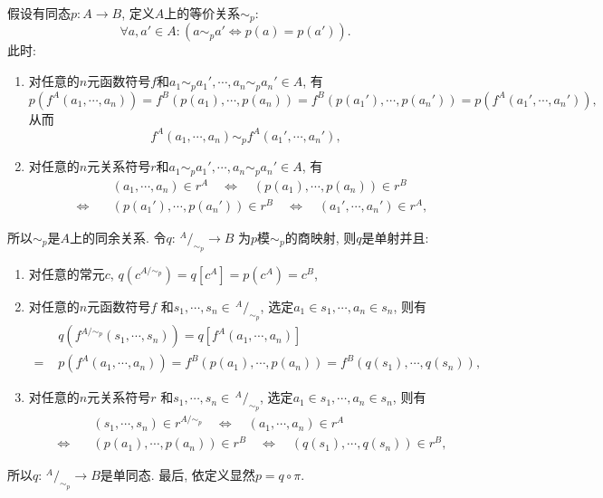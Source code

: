 假设有同态$p:A\to B$, 定义$A$上的等价关系$\sim_p$:
\[
    \forall a,a'\in A:(a\sim_p a'\iff p(a)=p(a')).
\]
此时:
\begin{enumerate}
    \item 对任意的$n$元函数符号$f$和$a_1\sim_p a_1',\cdots,a_n\sim_p a_n'\in A$, 有
    \[
        p(f^A(a_1,\cdots,a_n))=f^B(p(a_1),\cdots,p(a_n))
        =f^B(p(a_1'),\cdots,p(a_n'))=p(f^A(a_1',\cdots,a_n')),
    \]
    从而
    \[
        f^A(a_1,\cdots,a_n)\sim_p f^A(a_1',\cdots,a_n'),
    \]
    \item 对任意的$n$元关系符号$r$和$a_1\sim_p a_1',\cdots,a_n\sim_p a_n'\in A$, 有
    \[\begin{aligned}
        &(a_1,\cdots,a_n)\in r^A\quad\iff\quad(p(a_1),\cdots,p(a_n))\in r^B\\[-3pt]
        \quad\iff\quad&(p(a_1'),\cdots,p(a_n'))\in r^B\quad\iff\quad
        (a_1',\cdots,a_n')\in r^A,
    \end{aligned}\]
\end{enumerate}
\vspace{3pt}
所以$\sim_p$是$A$上的同余关系. 令$q:\,^{\displaystyle A}\!/_{\displaystyle\sim_p}\to B$
为$p$模$\sim_p$的商映射, 则$q$是单射并且:
\begin{enumerate}
    \item 对任意的常元$c$, $q(c^{A/\sim_p})=q[c^A]=p(c^A)=c^B$,
    \vspace{3pt}
    \item 对任意的$n$元函数符号$f$
    和$s_1,\cdots,s_n\in\,\!^{\displaystyle A}\!/_{\displaystyle\sim_p}$,
    选定$a_1\in s_1,\cdots,a_n\in s_n$, 则有
    \[\begin{aligned}
        &q(f^{A/\sim_p}(s_1,\cdots,s_n))=q[f^A(a_1,\cdots,a_n)]\\[-3pt]
        =\,\,&p(f^A(a_1,\cdots,a_n))=f^B(p(a_1),\cdots,p(a_n))
        =f^B(q(s_1),\cdots,q(s_n)),
    \end{aligned}\]
    \item 对任意的$n$元关系符号$r$
    和$s_1,\cdots,s_n\in\,\!^{\displaystyle A}\!/_{\displaystyle\sim_p}$,
    选定$a_1\in s_1,\cdots,a_n\in s_n$, 则有
    \[\begin{aligned}
        &(s_1,\cdots,s_n)\in r^{A/\sim_p}\quad\iff\quad
        (a_1,\cdots,a_n)\in r^A\\[-3pt]\quad\iff\quad&
        (p(a_1),\cdots,p(a_n))\in r^B\quad\iff\quad
        (q(s_1),\cdots,q(s_n))\in r^B,
    \end{aligned}\]
\end{enumerate}
所以$q:\,^{\displaystyle A}\!/_{\displaystyle\sim_p}\to B$是单同态.
最后, 依定义显然$p=q\circ\pi$.

